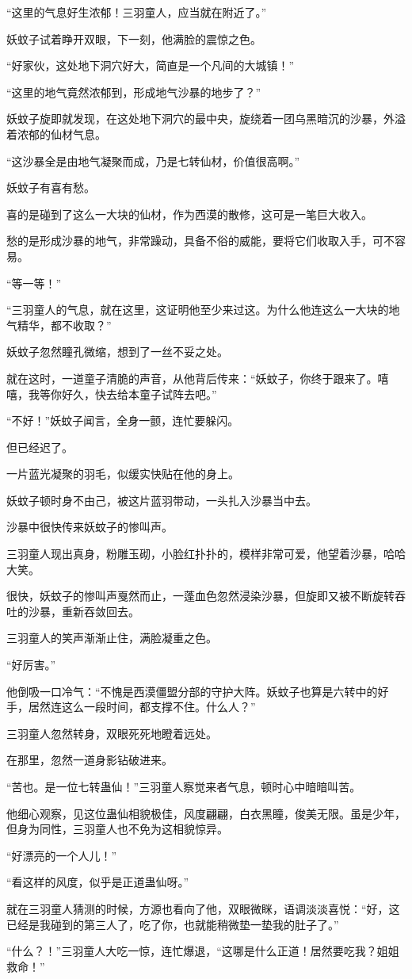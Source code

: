 \begin{this_body}
“这里的气息好生浓郁！三羽童人，应当就在附近了。”

妖蚊子试着睁开双眼，下一刻，他满脸的震惊之色。

“好家伙，这处地下洞穴好大，简直是一个凡间的大城镇！”

“这里的地气竟然浓郁到，形成地气沙暴的地步了？”

妖蚊子旋即就发现，在这处地下洞穴的最中央，旋绕着一团乌黑暗沉的沙暴，外溢着浓郁的仙材气息。

“这沙暴全是由地气凝聚而成，乃是七转仙材，价值很高啊。”

妖蚊子有喜有愁。

喜的是碰到了这么一大块的仙材，作为西漠的散修，这可是一笔巨大收入。

愁的是形成沙暴的地气，非常躁动，具备不俗的威能，要将它们收取入手，可不容易。

“等一等！”

“三羽童人的气息，就在这里，这证明他至少来过这。为什么他连这么一大块的地气精华，都不收取？”

妖蚊子忽然瞳孔微缩，想到了一丝不妥之处。

就在这时，一道童子清脆的声音，从他背后传来：“妖蚊子，你终于跟来了。嘻嘻，我等你好久，快去给本童子试阵去吧。”

“不好！”妖蚊子闻言，全身一颤，连忙要躲闪。

但已经迟了。

一片蓝光凝聚的羽毛，似缓实快贴在他的身上。

妖蚊子顿时身不由己，被这片蓝羽带动，一头扎入沙暴当中去。

沙暴中很快传来妖蚊子的惨叫声。

三羽童人现出真身，粉雕玉砌，小脸红扑扑的，模样非常可爱，他望着沙暴，哈哈大笑。

很快，妖蚊子的惨叫声戛然而止，一蓬血色忽然浸染沙暴，但旋即又被不断旋转吞吐的沙暴，重新吞敛回去。

三羽童人的笑声渐渐止住，满脸凝重之色。

“好厉害。”

他倒吸一口冷气：“不愧是西漠僵盟分部的守护大阵。妖蚊子也算是六转中的好手，居然连这么一段时间，都支撑不住。什么人？”

三羽童人忽然转身，双眼死死地瞪着远处。

在那里，忽然一道身影钻破进来。

“苦也。是一位七转蛊仙！”三羽童人察觉来者气息，顿时心中暗暗叫苦。

他细心观察，见这位蛊仙相貌极佳，风度翩翩，白衣黑瞳，俊美无限。虽是少年，但身为同性，三羽童人也不免为这相貌惊异。

“好漂亮的一个人儿！”

“看这样的风度，似乎是正道蛊仙呀。”

就在三羽童人猜测的时候，方源也看向了他，双眼微眯，语调淡淡喜悦：“好，这已经是我碰到的第三人了，吃了你，也就能稍微垫一垫我的肚子了。”

“什么？！”三羽童人大吃一惊，连忙爆退，“这哪是什么正道！居然要吃我？姐姐救命！”

\end{this_body}

